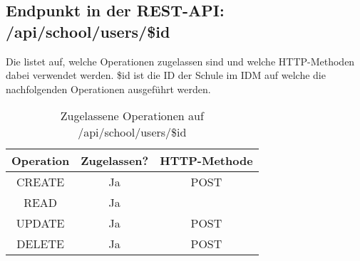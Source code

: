 \subsection{Endpunkt in der REST-API: /api/school/users/\$id}
Die  listet auf, welche Operationen zugelassen sind und welche HTTP-Methoden dabei verwendet werden. 
\$id ist die ID der Schule im IDM auf welche die nachfolgenden Operationen ausgeführt werden.

\begin{table}[!htbp]
	\begin{tabular}{|c|c|c|}
		\hline
			\textbf{Operation} & \textbf{Zugelassen?} & \textbf{HTTP-Methode} \\ \hline
			CREATE & Ja & POST \\ \hline 
			READ & Ja &  \\ \hline
			UPDATE & Ja & POST \\ \hline 
			DELETE & Ja & POST \\ \hline
	\end{tabular}

		\caption{Zugelassene Operationen auf /api/school/users/\$id}
		\label{tab:end:rest:api:school:users:id:meth}
\end{table}





